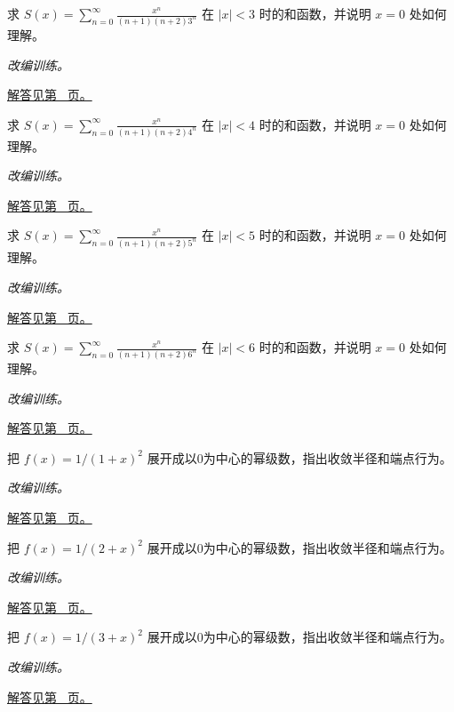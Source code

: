 \documentclass[12pt,fontset=fandol]{ctexart}
\begin{document}
\begin{example}[两次积分产生的系数]\label{ex:c27q15}
求 $S(x)=\displaystyle\sum_{n=0}^\infty\frac{x^n}{(n+1)(n+2)3^n}$ 在 $|x|<3$ 时的和函数，并说明 $x=0$ 处如何理解。
\par\textit{改编训练。}\par\hyperref[ans:c27q15]{解答见第~\pageref{ans:c27q15} 页。}
\end{example}
\begin{example}[两次积分产生的系数]\label{ex:c27q16}
求 $S(x)=\displaystyle\sum_{n=0}^\infty\frac{x^n}{(n+1)(n+2)4^n}$ 在 $|x|<4$ 时的和函数，并说明 $x=0$ 处如何理解。
\par\textit{改编训练。}\par\hyperref[ans:c27q16]{解答见第~\pageref{ans:c27q16} 页。}
\end{example}
\begin{example}[两次积分产生的系数]\label{ex:c27q17}
求 $S(x)=\displaystyle\sum_{n=0}^\infty\frac{x^n}{(n+1)(n+2)5^n}$ 在 $|x|<5$ 时的和函数，并说明 $x=0$ 处如何理解。
\par\textit{改编训练。}\par\hyperref[ans:c27q17]{解答见第~\pageref{ans:c27q17} 页。}
\end{example}
\begin{example}[两次积分产生的系数]\label{ex:c27q18}
求 $S(x)=\displaystyle\sum_{n=0}^\infty\frac{x^n}{(n+1)(n+2)6^n}$ 在 $|x|<6$ 时的和函数，并说明 $x=0$ 处如何理解。
\par\textit{改编训练。}\par\hyperref[ans:c27q18]{解答见第~\pageref{ans:c27q18} 页。}
\end{example}
\begin{example}[由几何展开求有理函数的级数]\label{ex:c27q19}
把 $f(x)=1/(1+x)^2$ 展开成以0为中心的幂级数，指出收敛半径和端点行为。
\par\textit{改编训练。}\par\hyperref[ans:c27q19]{解答见第~\pageref{ans:c27q19} 页。}
\end{example}
\begin{example}[由几何展开求有理函数的级数]\label{ex:c27q20}
把 $f(x)=1/(2+x)^2$ 展开成以0为中心的幂级数，指出收敛半径和端点行为。
\par\textit{改编训练。}\par\hyperref[ans:c27q20]{解答见第~\pageref{ans:c27q20} 页。}
\end{example}
\begin{example}[由几何展开求有理函数的级数]\label{ex:c27q21}
把 $f(x)=1/(3+x)^2$ 展开成以0为中心的幂级数，指出收敛半径和端点行为。
\par\textit{改编训练。}\par\hyperref[ans:c27q21]{解答见第~\pageref{ans:c27q21} 页。}
\end{example}
\end{document}
